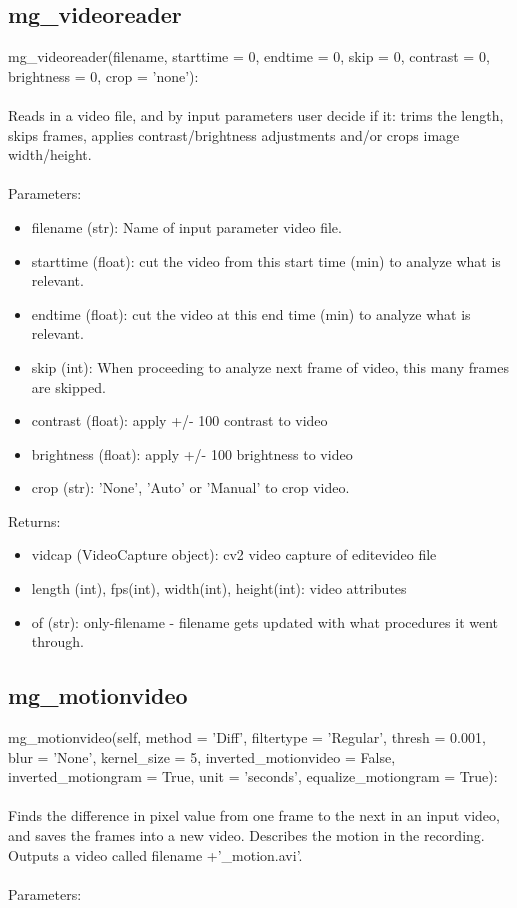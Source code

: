 \documentclass[9pt]{extarticle}
\begin{document}
\subsection{mg\_videoreader}
    mg\_videoreader(filename, starttime = 0, endtime = 0, skip = 0, contrast = 0, brightness = 0, crop = 'none'):
    \\\\
    Reads in a video file, and by input parameters user decide if it: trims the length, skips frames, applies contrast/brightness adjustments and/or crops image width/height.
    \\\\
    Parameters:
    \begin{itemize}
     \item [] filename (str): Name of input parameter video file.
     \item [] starttime (float): cut the video from this start time (min) to analyze what is relevant.
     \item [] endtime (float): cut the video at this end time (min) to analyze what is relevant.
     \item [] skip (int): When proceeding to analyze next frame of video, this many frames are skipped.
     \item [] contrast (float): apply +/- 100 contrast to video
     \item [] brightness (float): apply +/- 100 brightness to video
     \item [] crop (str): 'None', 'Auto' or 'Manual' to crop video.
    \end{itemize}
    Returns:
    \begin{itemize}
    \item [] vidcap (VideoCapture object): cv2 video capture of editevideo file
    \item [] length (int), fps(int), width(int), height(int): video attributes
     \item [] of (str): only-filename - filename gets updated with what procedures it went through.
 \end{itemize}

\subsection{mg\_motionvideo}    
    mg\_motionvideo(self, method = 'Diff', filtertype = 'Regular', thresh = 0.001, blur = 'None', kernel\_size = 5, inverted\_motionvideo = False, inverted\_motiongram = True, unit = 'seconds', equalize\_motiongram = True):
    \\\\
    Finds the difference in pixel value from one frame to the next in an input video, and saves the frames into a new video.
    Describes the motion in the recording.    
    Outputs a video called filename +'\_motion.avi'.
    \\\\
    Parameters:
    
\end{document}
